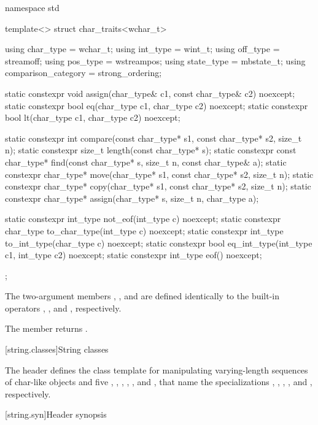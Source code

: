 %
\begin{codeblock}
namespace std {
  template<> struct char_traits<wchar_t> {
    using char_type  = wchar_t;
    using int_type   = wint_t;
    using off_type   = streamoff;
    using pos_type   = wstreampos;
    using state_type = mbstate_t;
    using comparison_category = strong_ordering;

    static constexpr void assign(char_type& c1, const char_type& c2) noexcept;
    static constexpr bool eq(char_type c1, char_type c2) noexcept;
    static constexpr bool lt(char_type c1, char_type c2) noexcept;

    static constexpr int compare(const char_type* s1, const char_type* s2, size_t n);
    static constexpr size_t length(const char_type* s);
    static constexpr const char_type* find(const char_type* s, size_t n,
                                           const char_type& a);
    static constexpr char_type* move(char_type* s1, const char_type* s2, size_t n);
    static constexpr char_type* copy(char_type* s1, const char_type* s2, size_t n);
    static constexpr char_type* assign(char_type* s, size_t n, char_type a);

    static constexpr int_type not_eof(int_type c) noexcept;
    static constexpr char_type to_char_type(int_type c) noexcept;
    static constexpr int_type to_int_type(char_type c) noexcept;
    static constexpr bool eq_int_type(int_type c1, int_type c2) noexcept;
    static constexpr int_type eof() noexcept;
  };
}
\end{codeblock}


\pnum
The two-argument members
,
,
and
are defined identically
to the built-in operators
\tcode{=},
\tcode{==},
and
\tcode{<},
respectively.

\pnum
The member
returns
.

[string.classes]{String classes}

\pnum
The header  defines the
 class template for manipulating
varying-length sequences of char-like objects and five
, ,
,
,
,
and , that name
the specializations
,
,
,
,
and
, respectively.

[string.syn]{Header  synopsis}
%

